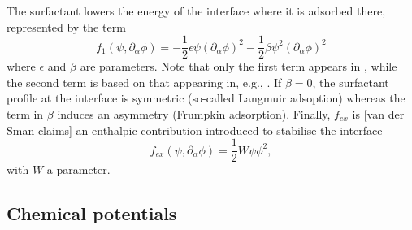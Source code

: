 The surfactant lowers the energy of the interface where it is adsorbed
there, represented by the term
\begin{equation}
f_1(\psi, \partial_\alpha \phi) 
= -{\textstyle \frac{1}{2}} \epsilon \psi (\partial_\alpha \phi)^2
  -{\textstyle \frac{1}{2}} \beta  \psi^2 (\partial_\alpha \phi)^2
\end{equation}
where $\epsilon$ and $\beta$ are parameters. Note that only the
first term appears in \cite{vandergraaf}, while the second term is
based on that appearing in, e.g., \cite{diamant}. If $\beta = 0$,
the surfactant profile at the interface is symmetric (so-called
Langmuir adsoption) whereas the term in $\beta$ induces an
asymmetry (Frumpkin adsorption).
Finally,  $f_{ex}$ is [van der Sman claims]
an enthalpic contribution introduced 
to stabilise the interface \cite{theissengompper}
\begin{equation}
f_{ex} (\psi, \partial_\alpha \phi) = {\textstyle\frac{1}{2}} W \psi \phi^2,
\end{equation}
with $W$ a parameter.

\subsection{Chemical potentials}

